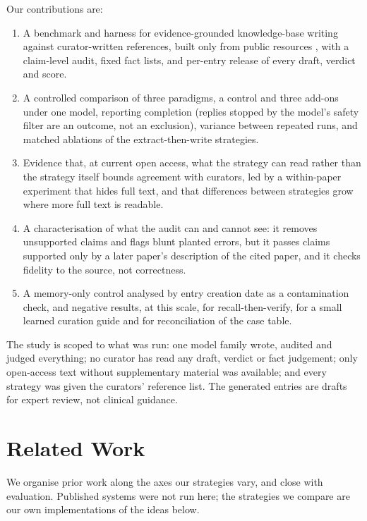 \documentclass{article} %
\begin{document}
Our contributions are:
\begin{enumerate}
\item A benchmark and harness for evidence-grounded knowledge-base writing against curator-written references, built only from public resources \citep{sayers2026database,Louden2020MedgenNcbis,rosonovski2024europe,seal2023genenames}, with a claim-level audit, fixed fact lists, and per-entry release of every draft, verdict and score.
\item A controlled comparison of three paradigms, a control and three add-ons under one model, reporting completion (replies stopped by the model's safety filter are an outcome, not an exclusion), variance between repeated runs, and matched ablations of the extract-then-write strategies.
\item Evidence that, at current open access, what the strategy can read rather than the strategy itself bounds agreement with curators, led by a within-paper experiment that hides full text, and that differences between strategies grow where more full text is readable.
\item A characterisation of what the audit can and cannot see: it removes unsupported claims and flags blunt planted errors, but it passes claims supported only by a later paper's description of the cited paper, and it checks fidelity to the source, not correctness.
\item A memory-only control analysed by entry creation date as a contamination check, and negative results, at this scale, for recall-then-verify, for a small learned curation guide and for reconciliation of the case table.
\end{enumerate}

The study is scoped to what was run: one model family wrote, audited and judged everything; no curator has read any draft, verdict or fact judgement; only open-access text without supplementary material was available; and every strategy was given the curators' reference list. The generated entries are drafts for expert review, not clinical guidance.

\section{Related Work}
\label{sec:related_work}
We organise prior work along the axes our strategies vary, and close with evaluation. Published systems were not run here; the strategies we compare are our own implementations of the ideas below.
\end{document}
